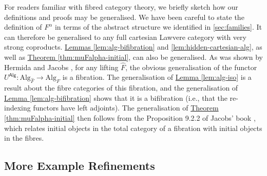 \documentclass{LMCS}
\newcommand{\Alg}{\mathrm{Alg}}
\newcommand{\palg}{U^{\mathsf{Alg}}}
\newcommand{\lemref}[1]{\hyperref[#1]{Lemma \ref*{#1}}}
\newcommand{\thmref}[1]{\hyperref[#1]{Theorem \ref*{#1}}}
\begin{document}
For readers familiar with fibred category theory, we briefly sketch
how our definitions and proofs may be generalised. We have been
careful to state the definition of $F^\alpha$ in terms of the abstract
structure we identified in \autoref{sec:families}. It can therefore be
generalised to any full cartesian Lawvere category with very strong
coproducts.  \hyperref[lem:alg-bifibration]{Lemmas
  \ref*{lem:alg-bifibration}} and \hyperref[lem:hidden-cartesian-alg]{
  \ref*{lem:hidden-cartesian-alg}}, as well as
\thmref{thm:muFalpha-initial}, can also be generalised. As was shown
by Hermida and Jacobs \cite{hermida98structural}, for any lifting
$\hat{F}$, the obvious generalisation of the functor $\palg :
\Alg_{\hat{F}} \to \Alg_F$ is a fibration. The generalisation of
\lemref{lem:alg-iso} is a result about the fibre categories of this
fibration, and the generalisation of \lemref{lem:alg-bifibration}
shows that it is a bifibration (i.e., that the re-indexing functors
have left adjoints). The generalisation of
\thmref{thm:muFalpha-initial} then follows from the Proposition 9.2.2
of Jacobs' book \cite{jacobs99book}, which relates initial objects in
the total category of a fibration with initial objects in the fibres.

\subsection{More Example Refinements}\label{sec:refining-examples}
\end{document}
